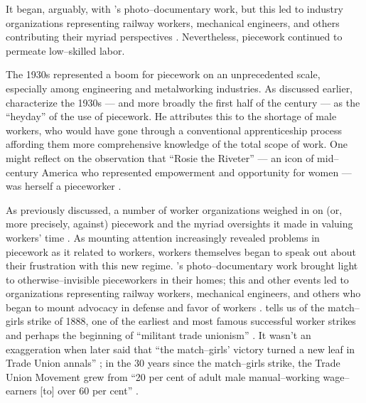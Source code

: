 \documentclass[trackingWork]{subfiles}
\begin{document}
It began, arguably, with \citeauthor{riisOtherSideLives}'s photo--documentary work,
but this led to industry organizations representing
railway workers, mechanical engineers, and others contributing their myriad perspectives
\cite{american1921problem,richards1904anything,riisOtherSideLives}.
Nevertheless, piecework continued to permeate low--skilled labor.



The 1930s represented a boom for piecework on an unprecedented scale,
especially among engineering and metalworking industries.
As discussed earlier, \citeauthor{hart2013rise} characterize the 1930s
--- and more broadly the first half of the  century ---
as the ``heyday'' of the use of piecework.
He attributes this to the shortage of male workers,
who would have gone through a conventional apprenticeship process
affording them more comprehensive knowledge of the total scope of work.
One might reflect on the observation that ``Rosie the Riveter''
--- an icon of mid-- century America who represented empowerment and opportunity for women \cite{honey1985creating} ---
was herself a pieceworker
\cite{davies2014origins}.

As previously discussed, a number of worker organizations weighed in on
(or, more precisely, against) piecework and the myriad oversights it made in valuing workers' time
\cite{american1921problem,richards1904anything}.
As mounting attention increasingly revealed problems in piecework as it related to workers,
workers themselves began to speak out about their frustration with this new regime.
\citeauthor{riisOtherSideLives}'s photo--documentary work
brought light to otherwise--invisible pieceworkers in their homes;
this and other events led to organizations representing
railway workers, mechanical engineers, and others
who began to mount advocacy in defense and favor of workers
\cite{american1921problem,richards1904anything,riisOtherSideLives}.
\citeauthor{10.2307/3827491} tells us of the match--girls strike of 1888,
one of the earliest and most famous successful worker strikes and perhaps
the beginning of ``militant trade unionism''
\cite{10.2307/3827491}.
It wasn't an exaggeration when \citeauthor{weyer1894history} later said that
``the match--girls' victory turned a new leaf in Trade Union annals'' \cite{weyer1894history};
in the 30 years since the match--girls strike,
the Trade Union Movement grew from
``20 per cent of adult male manual--working wage--earners [to] over 60 per cent''
\cite{webb1920history}.
\end{document}
